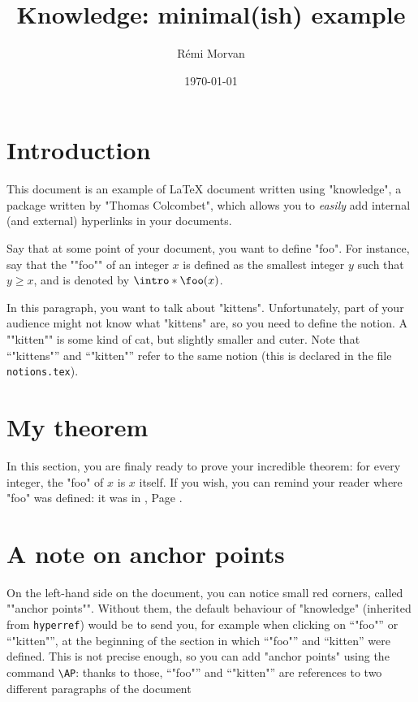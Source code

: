 \documentclass[a4]{article}
\title{Knowledge: minimal(ish) example}
\author{Rémi Morvan}
\date{\today}
\begin{document}
\maketitle


\section{Introduction}

This document is an example of {\LaTeX} document written using "knowledge", a package
written by "Thomas Colcombet", which allows you to \emph{easily} add internal (and external)
hyperlinks in your documents.

\AP Say that at some point of your document, you want to define "foo".
For instance, say that the ""foo"" of an integer $x$ is
defined as the smallest integer $y$ such that $y \geq x$, and is denoted
by $\intro*\foo(x)$.

\AP In this paragraph, you want to talk about "kittens". Unfortunately, part of your audience
might not know what "kittens" are, so you need to define the notion. A ""kitten"" is some
kind of cat, but slightly smaller and cuter. Note that ``"kittens"'' and ``"kitten"''
refer to the same notion (this is declared in the file \texttt{notions.tex}).


\section{My theorem}

In this section, you are finaly ready to prove your incredible theorem:
for every integer, the "foo" of $x$ is $x$ itself. If you wish, you can remind your reader
where "foo" was defined: it was in , Page .

\section{A note on anchor points}

\AP On the left-hand side on the document, you can notice small red corners, called ""anchor points"".
Without them, the default behaviour of "knowledge" (inherited from \texttt{hyperref}) would be to
send you, for example when clicking on ``"foo"'' or ``"kitten"'', at the beginning of the section in which ``"foo"'' and
``kitten'' were defined. This is not precise enough, so you can add "anchor points" using the command
\texttt{\textbackslash AP}: thanks to those, ``"foo"'' and ``"kitten"'' are references to two different paragraphs of
the document
\end{document}
